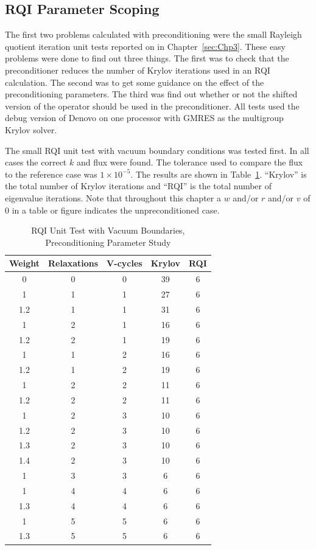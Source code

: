 \subsection{RQI Parameter Scoping}
The first two problems calculated with preconditioning were the small Rayleigh quotient iteration unit tests reported on in Chapter~\ref{sec:Chp3}. These easy problems were done to find out three things. The first was to check that the preconditioner reduces the number of Krylov iterations used in an RQI calculation. The second was to get some guidance on the effect of the preconditioning parameters. The third was find out whether or not the shifted version of the operator should be used in the preconditioner. All tests used the debug version of Denovo on one processor with GMRES as the multigroup Krylov solver.

The small RQI unit test with vacuum boundary conditions was tested first. In all cases the correct $k$ and flux were found. The tolerance used to compare the flux to the reference case was $1 \times 10^{-5}$. The results are shown in Table~\ref{table:RQIUnitTestVac}. ``Krylov'' is the total number of Krylov iterations and ``RQI'' is the total number of eigenvalue iterations. Note that throughout this chapter a $w$ and/or $r$ and/or $v$ of 0 in a table or figure indicates the unpreconditioned case.
%
\begin{table}[!h]
\caption{RQI Unit Test with Vacuum Boundaries, Preconditioning Parameter Study}
\begin{center}
\begin{tabular}{| c | c | c | c | c |}
\hline
Weight & Relaxations & V-cycles & Krylov & RQI \\[0.5ex]
\hline
0    & 0 & 0 & 39 & 6 \\
1    & 1 & 1 & 27 & 6 \\
1.2 & 1 & 1 & 31 & 6 \\
1    & 2 & 1 & 16 & 6 \\
1.2 & 2 & 1 & 19 & 6 \\
1    & 1 & 2 & 16 & 6 \\
1.2 & 1 & 2 & 19 & 6 \\
1    & 2 & 2 & 11 & 6 \\
1.2 & 2 & 2 & 11 & 6 \\
\hline
1    & 2 & 3 & 10 & 6 \\
1.2 & 2 & 3 & 10 & 6 \\
1.3 & 2 & 3 & 10 & 6 \\
1.4 & 2 & 3 & 10 & 6 \\
\hline
1    & 3 & 3 & 6   & 6 \\
1    & 4 & 4 & 6   & 6 \\
1.3 & 4 & 4 & 6   & 6 \\
1    & 5 & 5 & 6   & 6 \\
1.3 & 5 & 5 & 6   & 6 \\
\hline 
\end{tabular}
\end{center}
\label{table:RQIUnitTestVac}
\end{table}

